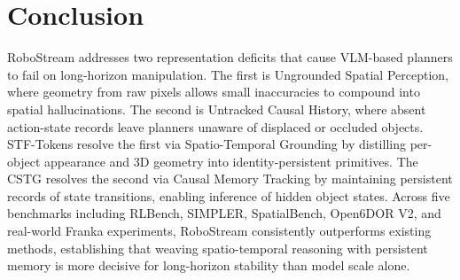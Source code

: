 \section{Conclusion}
\label{sec:conclusion}
RoboStream addresses two representation deficits that cause VLM-based planners to fail on long-horizon manipulation. The first is Ungrounded Spatial Perception, where geometry from raw pixels allows small inaccuracies to compound into spatial hallucinations. The second is Untracked Causal History, where absent action-state records leave planners unaware of displaced or occluded objects. STF-Tokens resolve the first via Spatio-Temporal Grounding by distilling per-object appearance and 3D geometry into identity-persistent primitives. The CSTG resolves the second via Causal Memory Tracking by maintaining persistent records of state transitions, enabling inference of hidden object states. Across five benchmarks including RLBench, SIMPLER, SpatialBench, Open6DOR V2, and real-world Franka experiments, RoboStream consistently outperforms existing methods, establishing that weaving spatio-temporal reasoning with persistent memory is more decisive for long-horizon stability than model scale alone.